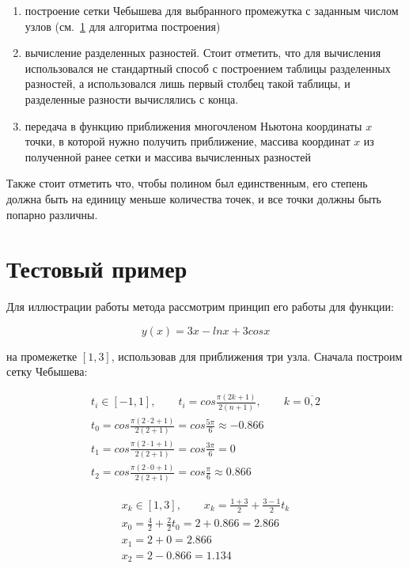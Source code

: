 \documentclass[11pt]{article}
\begin{document}
\begin{enumerate}
    \item построение сетки Чебышева для выбранного промежутка с заданным числом узлов (см.~\ref{sec:test} для алгоритма построения)
    \item вычисление разделенных разностей. Стоит отметить, что для вычисления использовался не стандартный способ с построением таблицы разделенных разностей, а использовался лишь первый столбец такой таблицы, и разделенные разности вычислялись с конца.
    \item передача в функцию приближения многочленом Ньютона координаты $x$ точки, в которой нужно получить приближение, массива координат $x$ из полученной ранее сетки и массива вычисленных разностей
\end{enumerate}

\bigskip

Также стоит отметить что, чтобы полином был единственным, его степень должна быть на
единицу меньше количества точек, и все точки должны быть попарно различны.

\section{Тестовый пример}\label{sec:test}

Для иллюстрации работы метода рассмотрим принцип его работы для функции:

\begin{equation}
y(x) = 3x - ln x + 3 cos x
\end{equation}

на промежетке $[1, 3]$, использовав для приближения три узла.
Сначала построим сетку Чебышева:

\begin{gather}
t_i \in [-1, 1], \qquad t_i = cos \frac{\pi (2k + 1)}{2(n+1)}, \qquad k = \overline{0, 2} \nonumber \\
t_0 = cos \frac{\pi (2 \cdot 2 + 1)}{2(2 + 1)} = cos \frac{5\pi}{6} \approx -0.866 \nonumber \\
t_1 = cos \frac{\pi (2 \cdot 1 + 1)}{2(2 + 1)} = cos \frac{3\pi}{6} = 0 \nonumber \\
t_2 = cos \frac{\pi (2 \cdot 0 + 1)}{2(2 + 1)} = cos \frac{\pi}{6} \approx 0.866 \nonumber
\end{gather}

\begin{gather}
x_k \in [1, 3], \qquad x_k = \frac{1 + 3}{2} + \frac{3 - 1}{2} t_k \nonumber \\
x_0 = \frac{4}{2} + \frac{2}{2} t_0 = 2 + 0.866 = 2.866 \nonumber \\
x_1 = 2 + 0 = 2.866 \nonumber \\
x_2 = 2 - 0.866 = 1.134 \nonumber
\end{gather}
\end{document}
